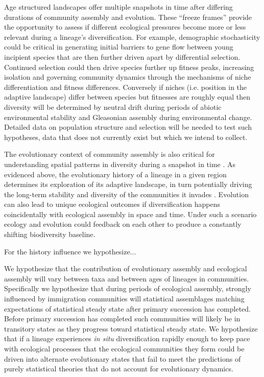 \documentclass[12pt]{article}
\begin{document}
Age structured landscapes offer multiple snapshots in time after
differing durations of community assembly and evolution. These
``freeze frames'' provide the opportunity to assess if different
ecological pressures become more or less relevant during a lineage's
diversification. For example, demographic stochasticity could be
critical in generating initial barriers to gene flow between young
incipient species that are then further driven apart by differential
selection. Continued selection could then drive species further up
fitness peaks, increasing isolation and governing community dynamics
through the mechanisms of niche differentiation and fitness
differences. Conversely if niches (i.e. position in the adaptive
landscape) differ between species but fitnesses are roughly equal then
diversity will be determined by neutral drift during periods of
abiotic environmental stability and Gleasonian assembly during
environmental change.  Detailed data on population structure and
selection will be needed to test such hypotheses, data that does not
currently exist but which we intend to collect.

The evolutionary context of community assembly is also critical for
understanding spatial patterns in diversity during a snapshot in time
\citep{ricklefs1987, losos2003nature, gillespie2004,
  ecoEvoMinnowGuy}. As evidenced above, the evolutionary history of a
lineage in a given region determines its exploration of its adaptive
landscape, in turn potentially driving the long-term stability and
diversity of the communities it invades \citep{chessonCrew,
  romingerSuperStat}. Evolution can also lead to unique ecological
outcomes if diversification happens coincidentally with ecological
assembly in space and time. Under such a scenario ecology and
evolution could feedback on each other to produce a constantly
shifting biodiversity baseline.

For the history influence we hypothesize...

We hypothesize that the contribution of evolutionary assembly and
ecological assembly will vary between taxa and between ages of
lineages in communities. Specifically we hypothesize that during
periods of ecological assembly, strongly influenced by immigration
communities will statistical assemblages matching expectations of
statistical steady state \citep{harte2011} after primary succession has
completed. Before primary succession has completed such communities
will likely be in transitory states as they progress toward
statistical steady state. We hypothesize that if a lineage experiences
{\it in situ} diversification rapidly enough to keep pace with
ecological processes that the ecological communities they form could
be driven into alternate evolutionary states that fail to meet the
predictions of purely statistical theories that do not account for
evolutionary dynamics.
\end{document}
